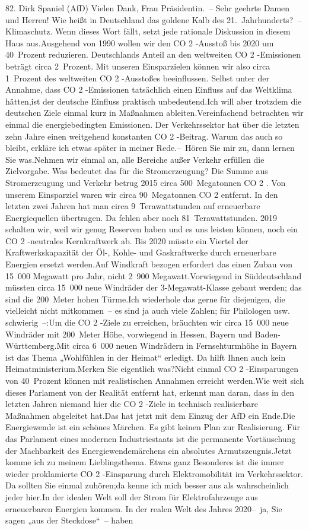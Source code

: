 \documentclass{article}
\begin{document}
	82. Dirk Spaniel (AfD) Vielen Dank, Frau Präsidentin. – Sehr geehrte Damen und Herren! Wie heißt in Deutschland das goldene Kalb des 21. Jahrhunderts? – Klimaschutz. Wenn dieses Wort fällt, setzt jede rationale Diskussion in diesem Haus aus.Ausgehend von 1990 wollen wir den CO 2 -Ausstoß bis 2020 um 40 Prozent reduzieren. Deutschlands Anteil an den weltweiten CO 2 -Emissionen beträgt circa 2 Prozent. Mit unseren Einsparzielen können wir also circa 1 Prozent des weltweiten CO 2 -Ausstoßes beeinflussen. Selbst unter der Annahme, dass CO 2 -Emissionen tatsächlich einen Einfluss auf das Weltklima hätten,ist der deutsche Einfluss praktisch unbedeutend.Ich will aber trotzdem die deutschen Ziele einmal kurz in Maßnahmen ableiten.Vereinfachend betrachten wir einmal die energiebedingten Emissionen. Der Verkehrssektor hat über die letzten zehn Jahre einen weitgehend konstanten CO 2 -Beitrag. Warum das auch so bleibt, erkläre ich etwas später in meiner Rede.– Hören Sie mir zu, dann lernen Sie was.Nehmen wir einmal an, alle Bereiche außer Verkehr erfüllen die Zielvorgabe. Was bedeutet das für die Stromerzeugung? Die Summe aus Stromerzeugung und Verkehr betrug 2015 circa 500 Megatonnen CO 2 . Von unserem Einsparziel waren wir circa 90 Megatonnen CO 2 entfernt. In den letzten zwei Jahren hat man circa 9 Terawattstunden auf erneuerbare Energiequellen übertragen. Da fehlen aber noch 81 Terawattstunden. 2019 schalten wir, weil wir genug Reserven haben und es uns leisten können, noch ein CO 2 -neutrales Kernkraftwerk ab. Bis 2020 müsste ein Viertel der Kraftwerkskapazität der Öl-, Kohle- und Gaskraftwerke durch erneuerbare Energien ersetzt werden.Auf Windkraft bezogen erfordert das einen Zubau von 15 000 Megawatt pro Jahr, nicht 2 900 Megawatt.Vorwiegend in Süddeutschland müssten circa 15 000 neue Windräder der 3-Megawatt-Klasse gebaut werden; das sind die 200 Meter hohen Türme.Ich wiederhole das gerne für diejenigen, die vielleicht nicht mitkommen – es sind ja auch viele Zahlen; für Philologen usw. schwierig –:Um die CO 2 -Ziele zu erreichen, bräuchten wir circa 15 000 neue Windräder mit 200 Meter Höhe, vorwiegend in Hessen, Bayern und Baden-Württemberg.Mit circa 6 000 neuen Windrädern in Fernsehturmhöhe in Bayern ist das Thema „Wohlfühlen in der Heimat“ erledigt. Da hilft Ihnen auch kein Heimatministerium.Merken Sie eigentlich was?Nicht einmal CO 2 -Einsparungen von 40 Prozent können mit realistischen Annahmen erreicht werden.Wie weit sich dieses Parlament von der Realität entfernt hat, erkennt man daran, dass in den letzten Jahren niemand hier die CO 2 -Ziele in technisch realisierbare Maßnahmen abgeleitet hat.Das hat jetzt mit dem Einzug der AfD ein Ende.Die Energiewende ist ein schönes Märchen. Es gibt keinen Plan zur Realisierung. Für das Parlament eines modernen Industriestaats ist die permanente Vortäuschung der Machbarkeit des Energiewendemärchens ein absolutes Armutszeugnis.Jetzt komme ich zu meinem Lieblingsthema. Etwas ganz Besonderes ist die immer wieder proklamierte CO 2 -Einsparung durch Elektromobilität im Verkehrssektor. Da sollten Sie einmal zuhören;da kenne ich mich besser aus als wahrscheinlich jeder hier.In der idealen Welt soll der Strom für Elektrofahrzeuge aus erneuerbaren Energien kommen. In der realen Welt des Jahres 2020– ja, Sie sagen „aus der Steckdose“ – haben 
\end{document}
